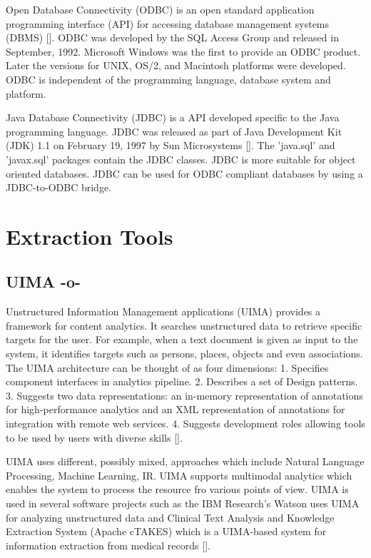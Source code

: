 Open Database Connectivity (ODBC) is an open standard application
programming interface (API) for accessing database management systems
(DBMS) [\cite{www-odbc}]. ODBC was developed by the SQL Access Group and
released in September, 1992. Microsoft Windows was the first to
provide an ODBC product. Later the versions for UNIX, OS/2, and
Macintosh platforms were developed. ODBC is independent of the
programming language, database system and platform.

Java Database Connectivity (JDBC) is a API developed specific to the
Java programming language. JDBC was released as part of Java
Development Kit (JDK) 1.1 on February 19, 1997 by Sun
Microsystems [\cite{www-jdbc}]. The 'java.sql' and 'javax.sql' packages
contain the JDBC classes. JDBC is more suitable for object oriented
databases. JDBC can be used for ODBC compliant databases by using a
JDBC-to-ODBC bridge.

\section{Extraction Tools}


\subsection{UIMA -o-}

Unstructured Information Management applications (UIMA) provides a
framework for content analytics. It searches unstructured data to
retrieve specific targets for the user. For example, when a text
document is given as input to the system, it identifies targets such
as persons, places, objects and even associations. The UIMA
architecture can be thought of as four dimensions: 1. Specifies
component interfaces in analytics pipeline.  2. Describes a set of
Design patterns. 3. Suggests two data representations: an in-memory
representation of annotations for high-performance analytics and an
XML representation of annotations for integration with remote web
services. 4. Suggests development roles allowing tools to be used by
users with diverse skills [\cite{www-wiki-uima}].

UIMA uses different, possibly mixed, approaches which include Natural
Language Processing, Machine Learning, IR. UIMA supports multimodal
analytics which enables the system to process the resource fro various
points of view. UIMA is used in several software projects such as the
IBM Research's Watson uses UIMA for analyzing unstructured data and
Clinical Text Analysis and Knowledge Extraction System (Apache cTAKES)
which is a UIMA-based system for information extraction from medical
records [\cite{www-uima-slideshare}].


